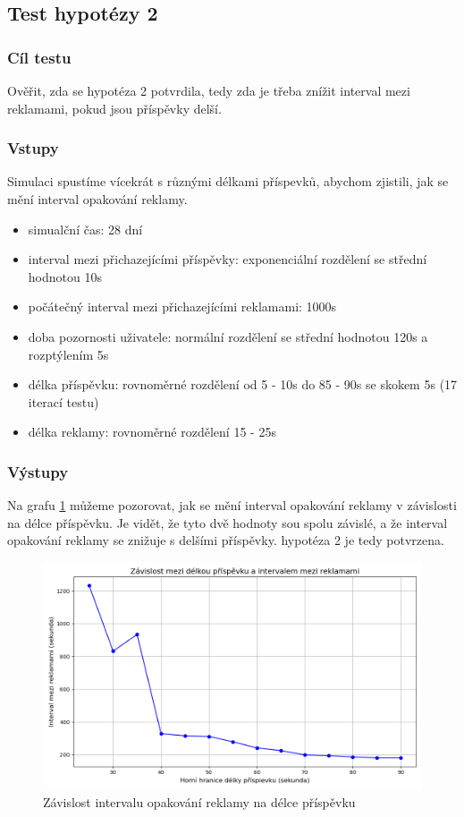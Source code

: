 \documentclass[11pt, a4paper]{article}
\begin{document}
\newpage

\subsection{Test hypotézy 2}

\subsubsection{Cíl testu}
Ověřit, zda se hypotéza 2 potvrdila, tedy zda je třeba znížit interval mezi reklamami, pokud jsou příspěvky delší.
\subsubsection{Vstupy}
Simulaci spustíme vícekrát s různými délkami příspevků, abychom zjistili, jak se mění interval opakování reklamy.
\begin{itemize}
    \item simualční čas: 28 dní
    \item interval mezi přichazejícími příspěvky: exponenciální rozdělení se střední hodnotou 10s
    \item počátečný interval mezi přichazejícími reklamami: 1000s
    \item doba pozornosti uživatele: normální rozdělení se střední hodnotou 120s a rozptýlením 5s
    \item délka příspěvku: rovnoměrné rozdělení od 5 - 10s do 85 - 90s se skokem 5s (17 iterací testu)
    \item délka reklamy: rovnoměrné rozdělení 15 - 25s
\end{itemize}

\subsubsection{Výstupy}

Na grafu \ref{fig:post_length_vs_ad_interval} můžeme pozorovat, jak se mění interval opakování reklamy v závislosti na délce příspěvku.
Je vidět, že tyto dvě hodnoty sou spolu závislé, a že interval opakování reklamy se znižuje s delšími příspěvky.
hypotéza 2 je tedy potvrzena.
\begin{figure}[h]
    \centering
    \includegraphics[width=\linewidth]{post_length_vs_ad_interval.png}
    \caption{Závislost intervalu opakování reklamy na délce příspěvku}
    \label{fig:post_length_vs_ad_interval}
\end{figure}
\end{document}
